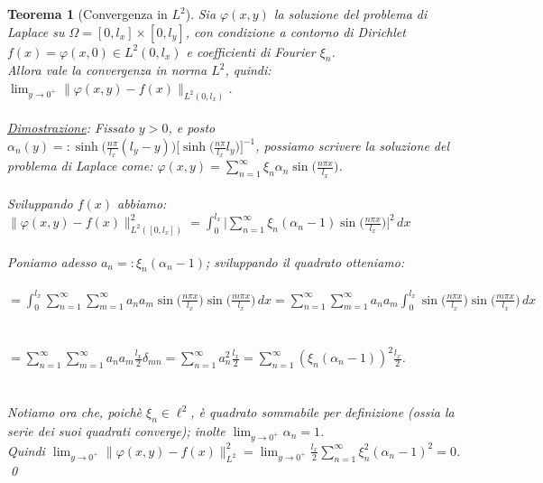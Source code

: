 \documentclass[a4paper,12pt]{report}
\newtheorem{teorema}{Teorema}[chapter]
\newcommand{\gt}{>}
\begin{document}
\begin{teorema}[Convergenza in $L^2$]
    Sia $\varphi(x,y)$ la soluzione del problema di Laplace su $\Omega=[0,l_x]\times[0,l_y]$, con condizione a contorno di Dirichlet $f(x)=\varphi(x,0)\in L^2(0,l_x)$ e coefficienti di Fourier $\xi_n$.
    \\Allora vale la convergenza in norma $L^2$, quindi: $\lim_{y\to 0^+}\|\varphi(x,y)-f(x)\|_{L^2(0,l_x)}$.
    \\
    \\\underline{Dimostrazione}: Fissato $y\gt 0$, e posto $\alpha_n(y)=:\sinh\bigg(\displaystyle\frac{n\pi}{l_x}(l_y-y)\bigg)\bigg[\sinh\bigg(\frac{n\pi}{l_x}l_y\bigg)\bigg]^{-1}$, possiamo scrivere la soluzione del problema di Laplace come: $\varphi(x,y)=\displaystyle\sum_{n=1 }^\infty \xi_n\alpha_n\sin\bigg(\frac{n\pi x}{l_x}\bigg)$.
    \\
    \\Sviluppando $f(x)$ abbiamo: $\|\varphi(x,y)-f(x)\|^2_{L^2([0,l_x])}=\displaystyle\int_0^{l_x}\bigg|\sum_{n=1}^\infty \xi_n(\alpha_n-1)\sin\bigg(\frac{n\pi x}{l_x}\bigg)\bigg|^2\,dx$
    \\ 
    \\Poniamo adesso $a_n=:\xi_n(\alpha_n-1)$; sviluppando il quadrato otteniamo:
    \\
    \\$=\displaystyle\int_0^{l_x}\sum_{n=1}^\infty\sum_{m=1}^\infty a_na_m\sin\bigg(\frac{n\pi x}{l_x}\bigg)\sin\bigg(\frac{m\pi x}{l_x}\bigg)\,dx=\sum_{n=1}^\infty\sum_{m=1}^\infty a_na_m\int_0^{l_x}\sin\bigg(\frac{n\pi x}{l_x}\bigg)\sin\bigg(\frac{m\pi x}{l_x}\bigg)\,dx$
    \\
    \\
    \\$\displaystyle=\sum_{n=1}^\infty\sum_{m=1}^\infty a_na_m\frac{l_x}{2}\delta_{mn}=\sum_{n=1}^\infty a_n^2\frac{l_x}{2}=\sum_{n=1}^\infty(\xi_n(\alpha_n-1))^2\frac{l_x}{2}$. 
    \\
    \\
    \\Notiamo ora che, poichè $\xi_n\in \ell^2$, è quadrato sommabile per definizione (ossia la serie dei suoi quadrati converge); inolte $\lim_{y\to 0^+}\alpha_n=1$. \\Quindi $\displaystyle\lim_{y\to 0^+}\|\varphi(x,y)-f(x)\|^2_{L^2}=\lim_{y\to 0^+}\frac{l_x}{2}\sum_{n=1}^\infty\xi_n^2(\alpha_n-1)^2=0$. \qed

\end{teorema}

\newpage
\end{document}
